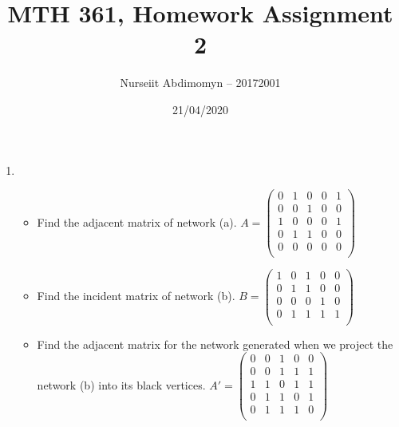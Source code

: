 \documentclass[12pt,a4paper,oneside,draft]{article}
\title{MTH 361, Homework Assignment 2}
\author{Nurseiit Abdimomyn -- 20172001}
\date{21/04/2020}
\begin{document}
\maketitle

\begin{enumerate}
  \item
    \begin{itemize}
      \item
        Find the adjacent matrix of network (a).
        \newline
        \newline
        $A = \begin{pmatrix}
              0&1&0&0&1\\
              0&0&1&0&0\\
              1&0&0&0&1\\
              0&1&1&0&0\\
              0&0&0&0&0\\
            \end{pmatrix}$
        \newline
      \item
        Find the incident matrix of network (b).
        \newline
        \newline
        $B = \begin{pmatrix}
              1&0&1&0&0\\
              0&1&1&0&0\\
              0&0&0&1&0\\
              0&1&1&1&1\\
            \end{pmatrix}$
        \newline
      \item
        Find the adjacent matrix for the network generated when we project
        the network (b) into its black vertices.
        \newline
        \newline
        $A' = \begin{pmatrix}
              0&0&1&0&0\\
              0&0&1&1&1\\
              1&1&0&1&1\\
              0&1&1&0&1\\
              0&1&1&1&0\\
            \end{pmatrix}$
        \newline

\end{itemize}
\end{enumerate}
\end{document}
